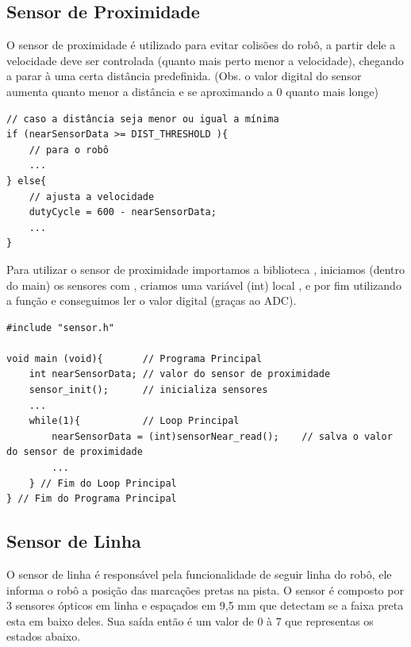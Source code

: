 \documentclass{article}
\begin{document}
\subsection{Sensor de Proximidade}
O sensor de proximidade é utilizado para evitar colisões do robô, a partir dele a velocidade deve ser controlada (quanto mais perto menor a velocidade), chegando a parar à uma certa distância predefinida. (Obs. o valor digital do sensor aumenta quanto menor a distância e se aproximando a 0 quanto mais longe)\par

\begin{lstlisting}[style = Matlab-editor, language = C2]
// caso a distância seja menor ou igual a mínima
if (nearSensorData >= DIST_THRESHOLD ){     
    // para o robô 
    ...
} else{
    // ajusta a velocidade
    dutyCycle = 600 - nearSensorData;
    ...
}
\end{lstlisting}

Para utilizar o sensor de proximidade importamos a biblioteca , iniciamos (dentro do main) os sensores com , criamos uma variável (int) local , e por fim utilizando a função  e conseguimos ler o valor digital (graças ao ADC).\par


\begin{lstlisting}[style = Matlab-editor, language = C2]
#include "sensor.h"

void main (void){       // Programa Principal
    int nearSensorData; // valor do sensor de proximidade
    sensor_init();      // inicializa sensores
    ...
    while(1){           // Loop Principal
        nearSensorData = (int)sensorNear_read();    // salva o valor do sensor de proximidade
        ...
    } // Fim do Loop Principal
} // Fim do Programa Principal
\end{lstlisting}



\subsection{Sensor de Linha}

O sensor de linha é responsável pela funcionalidade de seguir linha do robô, ele informa o robô a posição das marcações pretas na pista. O sensor é composto por 3 sensores ópticos em linha e espaçados em 9,5 mm que detectam se a faixa preta esta em baixo deles. Sua saída então é um valor de 0 à 7 que representas os estados abaixo. 
\end{document}
